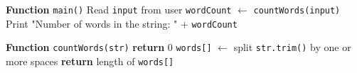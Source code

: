 \begin{algorithm}[H]
\caption{Count Number of Words in a String}
\begin{algorithmic}[1]
\STATE \textbf{Function} \texttt{main()}
\STATE \hspace{1em} Read \texttt{input} from user
\STATE \hspace{1em} \texttt{wordCount} $\gets$ \texttt{countWords(input)}
\STATE \hspace{1em} Print "Number of words in the string: " + \texttt{wordCount}

\STATE

\STATE \textbf{Function} \texttt{countWords(str)}
    \STATE \textbf{return} 0
\ENDIF
\STATE \texttt{words[]} $\gets$ split \texttt{str.trim()} by one or more spaces
\STATE \textbf{return} length of \texttt{words[]}
\end{algorithmic}
\end{algorithm}